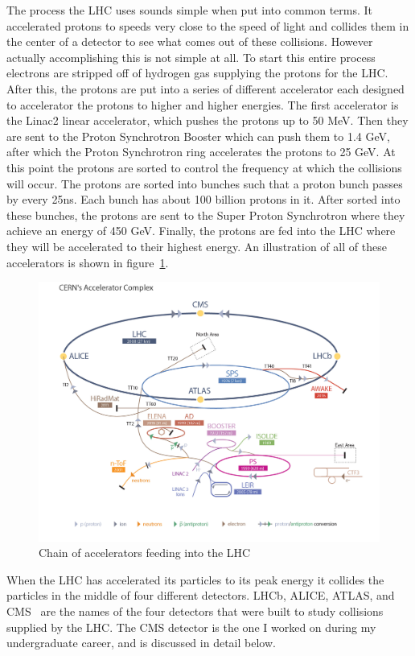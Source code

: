 The process the LHC uses sounds simple when put into common terms. It accelerated protons to speeds very close to the speed of light and collides them in the center of a detector to see what comes out of these collisions. However actually accomplishing this is not simple at all. To start this entire process electrons are stripped off of hydrogen gas supplying the protons for the LHC. After this, the protons are put into a series of different accelerator each designed to accelerator the protons to higher and higher energies. The first accelerator is the Linac2 linear accelerator, which pushes the protons up to 50 MeV. Then they are sent to the Proton Synchrotron Booster which can push them to 1.4 GeV, after which the Proton Synchrotron ring accelerates the protons to 25 GeV. At this point the protons are sorted to control the frequency at which the collisions will occur. The protons are sorted into bunches such that a proton bunch passes by every 25ns. Each bunch has about 100 billion protons in it. After sorted into these bunches, the protons are sent to the Super Proton Synchrotron where they achieve an energy of 450 GeV. Finally, the protons are fed into the LHC where they will be accelerated to their highest energy. An illustration of all of these accelerators is shown in figure~\ref{fig:acceleratorcomplex}.

\begin{figure}
\centering
\includegraphics[width=0.8\linewidth]{Figures/acceleratorcomplex.jpg}
\caption{Chain of accelerators feeding into the LHC}
\label{fig:acceleratorcomplex}
\end{figure}

When the LHC has accelerated its particles to its peak energy it collides the particles in the middle of four different detectors. LHCb, ALICE, ATLAS, and CMS~\cite{CMS} are the names of the four detectors that were built to study collisions supplied by the LHC. The CMS detector is the one I worked on during my undergraduate career, and is discussed in detail below.

